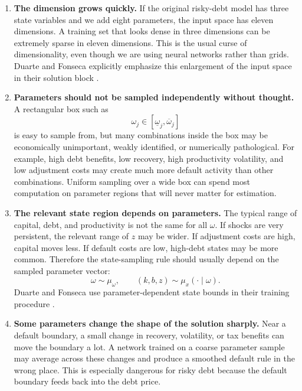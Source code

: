 \documentclass[11pt]{article}
\newcommand{\1}{\mathbf{1}}
\begin{document}
\begin{enumerate}[leftmargin=2em]
  \item \textbf{The dimension grows quickly.} If the original risky-debt model
  has three state variables and we add eight parameters, the input space has
  eleven dimensions. A training set that looks dense in three dimensions can
  be extremely sparse in eleven dimensions. This is the usual curse of
  dimensionality, even though we are using neural networks rather than grids.
  Duarte and Fonseca explicitly emphasize this enlargement of the input space
  in their solution block \citep[Section 3.1]{duartefonseca2026ai}.

  \item \textbf{Parameters should not be sampled independently without thought.}
  A rectangular box such as
  \[
    \omega_j\in[\underline\omega_j,\overline\omega_j]
  \]
  is easy to sample from, but many combinations inside the box may be
  economically unimportant, weakly identified, or numerically pathological.
  For example, high debt benefits, low recovery, high productivity volatility,
  and low adjustment costs may create much more default activity than other
  combinations. Uniform sampling over a wide box can spend most computation on
  parameter regions that will never matter for estimation.

  \item \textbf{The relevant state region depends on parameters.} The typical
  range of capital, debt, and productivity is not the same for all
  \(\omega\). If shocks are very persistent, the relevant range of \(z\) may be
  wider. If adjustment costs are high, capital moves less. If default costs are
  low, high-debt states may be more common. Therefore the state-sampling rule
  should usually depend on the sampled parameter vector:
  \[
    \omega \sim \mu_\omega,
    \qquad
    (k,b,z)\sim \mu_x(\cdot\mid \omega).
  \]
  Duarte and Fonseca use parameter-dependent state bounds in their training
  procedure \citep[Appendix A.2 and Appendix A.3.1]{duartefonseca2026ai}.

  \item \textbf{Some parameters change the shape of the solution sharply.}
  Near a default boundary, a small change in recovery, volatility, or tax
  benefits can move the boundary a lot. A network trained on a coarse parameter
  sample may average across these changes and produce a smoothed default rule
  in the wrong place. This is especially dangerous for risky debt because the
  default boundary feeds back into the debt price.


\end{enumerate}
\end{document}
